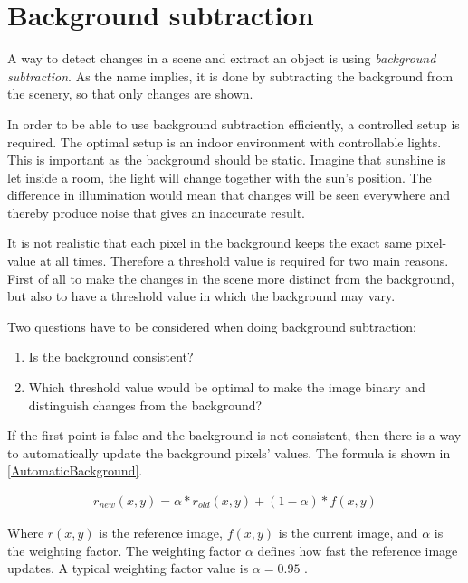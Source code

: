 \section{Background subtraction}
A way to detect changes in a scene and extract an object is using \textit{background subtraction}. As the name implies, it is done by subtracting the background from the scenery, so that only changes are shown.

In order to be able to use background subtraction efficiently, a controlled setup is required. The optimal setup is an indoor environment with controllable lights. This is important as the background should be static. Imagine that sunshine is let inside a room, the light will change together with the sun's position. The difference in illumination would mean that changes will be seen everywhere and thereby produce noise that gives an inaccurate result.

It is not realistic that each pixel in the background keeps the exact same pixel-value at all times. Therefore a threshold value is required for two main reasons. First of all to make the changes in the scene more distinct from the background, but also to have a threshold value in which the background may vary.

Two questions have to be considered when doing background subtraction:
\begin{enumerate} 
	\item Is the background consistent? 
	\item Which threshold value would be optimal to make the image binary and distinguish changes from the background? 
\end{enumerate}

If the first point is false and the background is not consistent, then there is a way to automatically update the background pixels' values. The formula is shown in \ref{AutomaticBackground}.

\begin{equation}
	\begin{aligned}
  		r_{new}(x,y)=\alpha*r_{old}(x,y)+(1-\alpha)*f(x,y)
		\label{AutomaticBackground}  
 	\end{aligned}
\end{equation}  

Where $r(x,y)$ is the reference image, $f(x,y)$ is the current image, and $\alpha$ is the weighting factor. The weighting factor $\alpha$ defines how fast the reference image updates. A typical weighting factor value is  $\alpha = 0.95$ \citep{ip_book}.

